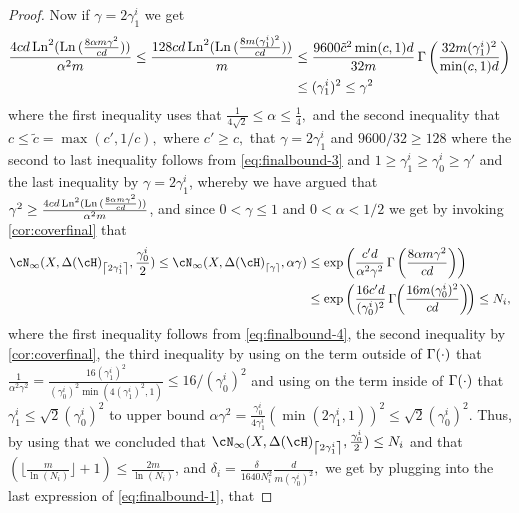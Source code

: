 \begin{proof}
    Now if $ \gamma=2\gamma_{1}^{i} $ we get  
    \begin{align*}
        \frac{4cd\operatorname{\mathrm{Ln}}^{2}(\operatorname{\mathrm{Ln}}{ ( \frac{8\alpha m \gamma^{2}}{cd}) }) }{\alpha^{2}m}\leq \frac{128cd\operatorname{\mathrm{Ln}}^{2}(\operatorname{\mathrm{Ln}}{ ( \frac{8 m(\gamma_{1}^{i})^{2}}{cd}) }) }{m} 
        &\leq \frac{9600\tilde{c}^2 \min(c,1)d}{32m} \operatorname{\Gamma}{\left(  \frac{32 m (\gamma_{1}^{i})^{2}}{\min(c,1)d} \right)}
        \\ &\leq(\gamma_{1}^{i})^2\leq \gamma^{2}
    \end{align*}
    where the first inequality uses that $ \frac{1}{4\sqrt{2}}\leq \alpha \leq \frac{1}{4},$ and the second inequality that $ c\leq \tilde{c}=\max(c',1/c),$ where $ c'\geq c,$ that $ \gamma=2\gamma_{1}^{i} $   and $ 9600/32 \geq128$ where the second to last inequality follows from \cref{eq:finalbound-3} and $ 1\geq\gamma_{1}^{i}\geq\gamma_{0}^{i}\geq\gamma'$ and the last inequality by $ \gamma=2\gamma_{1}^{i} $, whereby we have argued that $ \gamma^{2}\geq \frac{4cd\operatorname{\mathrm{Ln}}^{2}(\operatorname{\mathrm{Ln}}{ ( \frac{8\alpha m \gamma^{2}}{cd}) }) }{\alpha^{2}m}$, and since $ 0<\gamma\leq1 $ and $ 0<\alpha< 1/2 $ we get by invoking  \cref{cor:coverfinal} that  
    \begin{align*}
        \cN_{\infty}(X,\dlh_{\left\lceil2\gamma_{1}^{i}\right\rceil},\frac{\gamma_{0}^{i}}{2})
        \leq
        \cN_{\infty}(X,\dlh_{\left\lceil\gamma\right\rceil},\alpha \gamma)   
        &\leq 
        \exp{\left(\frac{c'd}{\alpha^{2}\gamma^{2}}\func\left( \frac{8\alpha m \gamma^{2}}{cd}\right) \right)}  
        \\
        &\leq 
        \exp{\left(\frac{16 c'd}{ (\gamma_{0}^{i})^{2}} \func\negmedspace{\left(  \frac{16 m(\gamma_{0}^{i})^{2}}{cd} \right)}\negmedspace \right)}  
        \leq N_{i} ,
    \end{align*}
     where the first inequality follows from \cref{eq:finalbound-4}, the second inequality by \cref{cor:coverfinal}, the third inequality by  using on the term outside of
     $\operatorname{\Gamma}(\cdot)$ that $ \frac{1}{\alpha^{2}\gamma^{2}} =\frac{16(\gamma_{1}^{i})^{2}}{(\gamma_{0}^{i})^{2}\min(4(\gamma_{1}^{i})^{2},1)}\leq
    16/(\gamma_{0}^{i})^{2} $  and using on the term inside of
    $\operatorname{\Gamma}(\cdot)$
    that  $ \gamma_{1}^{i}\leq \sqrt{2}(\gamma_{0}^{i})^{2} $ to upper bound
    $ \alpha
    \gamma^{2}=\frac{\gamma_{0}^{i}}{4\gamma_{1}^{i}}(\min(2\gamma_{1}^{i},1))^{2}\leq
    \sqrt{2}(\gamma_{0}^{i})^{2}$.   
    Thus, by using that we concluded that $  \cN_{\infty}(X,\dlh_{\left\lceil2\gamma_{1}^{i}\right\rceil},\frac{\gamma_{0}^{i}}{2})
    \leq N_{i} $ and that $ (\lfloor\frac{m}{\ln{(N_{i} )}}\rfloor+1)\leq   \frac{2m}{\ln{(N_{i} )}}$, and $  \delta_{i}= \frac{\delta}{1640N_{i}^{2}} \frac{d}{m(\gamma_{0}^{i})^{2}},$ we get by plugging into the last expression of \cref{eq:finalbound-1}, that 

\end{proof}
